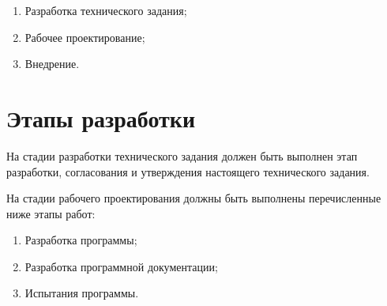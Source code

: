 \documentclass[14pt,a4paper,final]{extreport}
\begin{document}
\begin{enumerate}[label=\asbuk*),ref=\asbuk*]
	\item Разработка технического задания;
	\item Рабочее проектирование;
	\item Внедрение.
\end{enumerate}


\section{Этапы разработки}
На стадии разработки технического задания должен быть выполнен этап разработки, согласования и утверждения настоящего технического задания.

На стадии рабочего проектирования должны быть выполнены перечисленные ниже
этапы работ:
\begin{enumerate}[label=\asbuk*),ref=\asbuk*]
	\item Разработка программы;
	\item Разработка программной документации;
	\item Испытания программы.
\end{enumerate}

\fancyhead[C]{\bfseries\thepage\\\docstamp}  %
\end{document}
